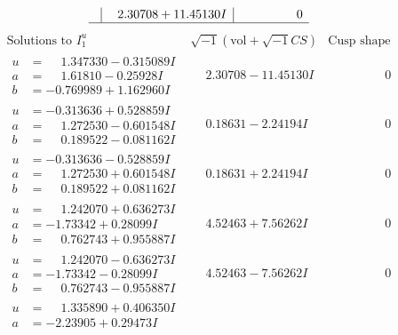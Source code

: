 \documentclass[1p]{elsarticle_modified}
\theoremstyle{definition}
\newcommand{\I}{\sqrt{-1}}
\begin{document}
$$\begin{array}{c|c|c}
 & \phantom{-}2.30708 + 11.45130 I & \phantom{-0.000000 } 0\\
 \hline 
 \end{array}$$\newpage$$\begin{array}{c|c|c}  
\text{Solutions to }I^u_{1}& \I (\text{vol} + \sqrt{-1}CS) & \text{Cusp shape}\\
 \hline 
\begin{aligned}
u &= \phantom{-}1.347330 - 0.315089 I \\
a &= \phantom{-}1.61810 - 0.25928 I \\
b &= -0.769989 + 1.162960 I\end{aligned}
 & \phantom{-}2.30708 - 11.45130 I & \phantom{-0.000000 } 0 \\ \hline\begin{aligned}
u &= -0.313636 + 0.528859 I \\
a &= \phantom{-}1.272530 - 0.601548 I \\
b &= \phantom{-}0.189522 - 0.081162 I\end{aligned}
 & \phantom{-}0.18631 - 2.24194 I & \phantom{-0.000000 } 0 \\ \hline\begin{aligned}
u &= -0.313636 - 0.528859 I \\
a &= \phantom{-}1.272530 + 0.601548 I \\
b &= \phantom{-}0.189522 + 0.081162 I\end{aligned}
 & \phantom{-}0.18631 + 2.24194 I & \phantom{-0.000000 } 0 \\ \hline\begin{aligned}
u &= \phantom{-}1.242070 + 0.636273 I \\
a &= -1.73342 + 0.28099 I \\
b &= \phantom{-}0.762743 + 0.955887 I\end{aligned}
 & \phantom{-}4.52463 + 7.56262 I & \phantom{-0.000000 } 0 \\ \hline\begin{aligned}
u &= \phantom{-}1.242070 - 0.636273 I \\
a &= -1.73342 - 0.28099 I \\
b &= \phantom{-}0.762743 - 0.955887 I\end{aligned}
 & \phantom{-}4.52463 - 7.56262 I & \phantom{-0.000000 } 0 \\ \hline\begin{aligned}
u &= \phantom{-}1.335890 + 0.406350 I \\
a &= -2.23905 + 0.29473 I \\

\end{aligned}
\end{array}$$
\end{document}
